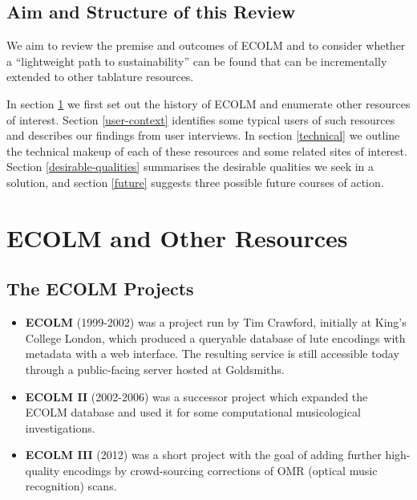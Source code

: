 \documentclass[sigconf, nonacm=true]{acmart}
\begin{document}
\begin{sloppypar}
  \subsection{Aim and Structure of this Review}

  We aim to review the premise and outcomes of ECOLM and to consider
  whether a ``lightweight path to sustainability'' can be found that
  can be incrementally extended to other tablature resources.

  In section \ref{enumerate-resources} we first set out the history of
  ECOLM and enumerate other resources of interest. Section
  \ref{user-context} identifies some typical users of such resources
  and describes our findings from user interviews. In section
  \ref{technical} we outline the technical makeup of each of these
  resources and some related sites of interest. Section
  \ref{desirable-qualities} summarises the desirable qualities we seek
  in a solution, and section \ref{future} suggests three possible
  future courses of action.

  \section{ECOLM and Other Resources}\label{enumerate-resources}
  
  \subsection{The ECOLM Projects}

  \begin{itemize}
  \item {\bf ECOLM} (1999-2002) was a project run by Tim Crawford,
    initially at King's College London, which produced a queryable
    database of lute encodings with metadata with a web interface. The
    resulting service is still accessible today through a
    public-facing server hosted at Goldsmiths.
  \item {\bf ECOLM II} (2002-2006) was a successor project which
    expanded the ECOLM database and used it for some computational
    musicological investigations.
  \item {\bf ECOLM III} (2012) was a short project with the goal of
    adding further high-quality encodings by crowd-sourcing
    corrections of OMR (optical music recognition) scans.
  \end{itemize}


\end{sloppypar}
\end{document}

